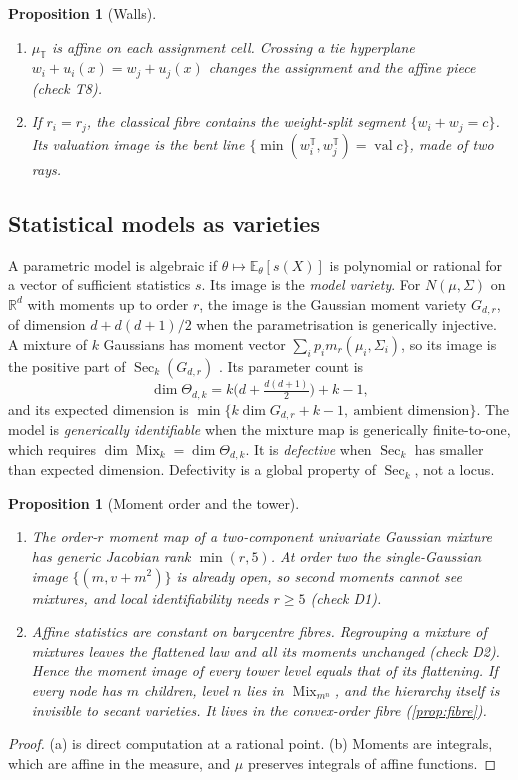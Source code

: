 \documentclass[11pt]{article}
\newtheorem{proposition}[theorem]{Proposition}
\theoremstyle{definition}
\newcommand{\T}{\mathbb T}
\newcommand{\R}{\mathbb R}
\newcommand{\EE}{\mathbb E}
\newcommand{\val}{\operatorname{val}}
\newcommand{\Mix}{\operatorname{Mix}}
\newcommand{\Sec}{\operatorname{Sec}}
\begin{document}
\begin{proposition}[Walls]\label{prop:walls}
\begin{enumerate}[label=(\alph*)]
\item $\mu_\T$ is affine on each assignment cell. Crossing a tie hyperplane $w_i+u_i(x)=w_j+u_j(x)$ changes the assignment and the
  affine piece (check T8).
\item If $r_i=r_j$, the classical fibre contains the weight-split segment $\{w_i+w_j=c\}$. Its valuation image is the bent line
  $\{\min(w^\T_i,w^\T_j)=\val c\}$, made of two rays.
\end{enumerate}
\end{proposition}

\subsection{Statistical models as varieties}
A parametric model is algebraic if $\theta\mapsto\EE_\theta[s(X)]$ is polynomial or rational for a vector of sufficient statistics $s$.
Its image is the \emph{model variety}. For $N(\mu,\Sigma)$ on $\R^d$ with moments up to order $r$, the image is the Gaussian moment
variety $G_{d,r}$, of dimension $d+d(d+1)/2$ when the parametrisation is generically injective. A mixture of $k$ Gaussians has moment
vector $\sum_ip_im_r(\mu_i,\Sigma_i)$, so its image is the positive part of $\Sec_k(G_{d,r})$ \cite{AFS2016}. Its parameter count is
\[
\dim\Theta_{d,k}=k\big(d+\tfrac{d(d+1)}2\big)+k-1,
\]
and its expected dimension is $\min\{k\dim G_{d,r}+k-1,\ \text{ambient dimension}\}$. The model is \emph{generically identifiable}
when the mixture map is generically finite-to-one, which requires $\dim\Mix_k=\dim\Theta_{d,k}$. It is \emph{defective} when
$\Sec_k$ has smaller than expected dimension. Defectivity is a global property of $\Sec_k$, not a locus.

\begin{proposition}[Moment order and the tower]\label{prop:moments}
\begin{enumerate}[label=(\alph*)]
\item The order-$r$ moment map of a two-component univariate Gaussian mixture has generic Jacobian rank $\min(r,5)$. At order two the
  single-Gaussian image $\{(m,v+m^2)\}$ is already open, so second moments cannot see mixtures, and local identifiability needs
  $r\ge5$ (check D1).
\item Affine statistics are constant on barycentre fibres. Regrouping a mixture of mixtures leaves the flattened law and all its
  moments unchanged (check D2). Hence the moment image of every tower level equals that of its flattening. If every node has $m$
  children, level $n$ lies in $\Mix_{m^n}$, and the hierarchy itself is invisible to secant varieties. It lives in the convex-order
  fibre (\cref{prop:fibre}).
\end{enumerate}
\end{proposition}
\begin{proof}
(a) is direct computation at a rational point. (b) Moments are integrals, which are affine in the measure, and $\mu$ preserves
integrals of affine functions.
\end{proof}
\end{document}
